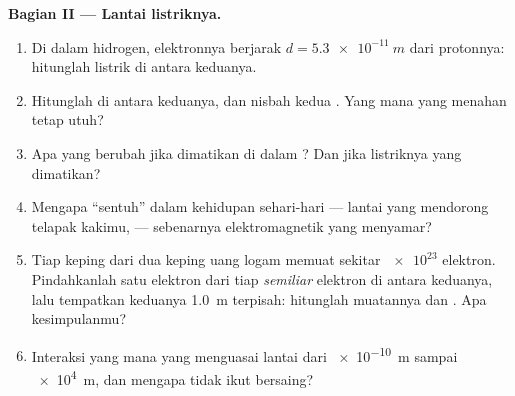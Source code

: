 \begin{problem}
\medskip
\noindent\textbf{Bagian II --- Lantai listriknya.}
\begin{enumerate}[resume]
  \item Di dalam  hidrogen, elektronnya berjarak
        $d = \qty{5.3e-11}{m}$ dari protonnya: hitunglah  listrik
        di antara keduanya.
  \item Hitunglah  di antara keduanya, dan nisbah kedua
        . Yang mana yang menahan  tetap utuh?
  \item Apa yang berubah jika  dimatikan di dalam ? Dan
        jika listriknya yang dimatikan?
  \item Mengapa  ``sentuh'' dalam kehidupan sehari-hari --- lantai
        yang mendorong telapak kakimu,  --- sebenarnya
        elektromagnetik yang menyamar?
  \item Tiap keping dari dua keping uang logam memuat sekitar
        $\num{e23}$ elektron. Pindahkanlah satu elektron dari tiap
        \emph{semiliar} elektron di antara keduanya, lalu tempatkan
        keduanya \qty{1.0}{m} terpisah: hitunglah muatannya dan
        . Apa kesimpulanmu?
  \item Interaksi yang mana yang menguasai lantai dari \qty{e-10}{m}
        sampai \qty{e4}{m}, dan mengapa  tidak ikut
        bersaing?
\end{enumerate}


\end{problem}
